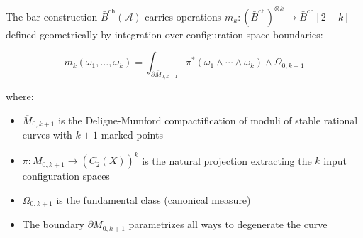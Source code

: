\begin{theorem}\label{thm:ainfty-moduli}
The bar construction $\bar{B}^{\text{ch}}(\mathcal{A})$ carries operations 
$m_k: (\bar{B}^{\text{ch}})^{\otimes k} \to \bar{B}^{\text{ch}}[2-k]$ defined 
geometrically by integration over configuration space boundaries:

$$m_k(\omega_1, \ldots, \omega_k) = \int_{\partial \overline{M}_{0,k+1}} 
\pi^*(\omega_1 \wedge \cdots \wedge \omega_k) \wedge \Omega_{0,k+1}$$

where:
\begin{itemize}
\item $\overline{M}_{0,k+1}$ is the Deligne-Mumford compactification of moduli 
of stable rational curves with $k+1$ marked points
\item $\pi: \overline{M}_{0,k+1} \to (\overline{C}_2(X))^k$ is the natural 
projection extracting the $k$ input configuration spaces
\item $\Omega_{0,k+1}$ is the fundamental class (canonical measure)
\item The boundary $\partial \overline{M}_{0,k+1}$ parametrizes all ways to 
degenerate the curve
\end{itemize}
\end{theorem}

